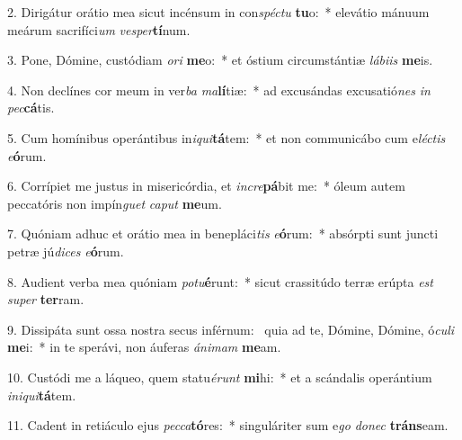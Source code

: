 2. Dirigátur orátio mea sicut incénsum in con\textit{spéc}\textit{tu} \textbf{tu}o:~*  elevátio mánuum meárum sacrifíci\textit{um} \textit{ves}\textit{per}\textbf{tí}num.\

3. Pone, Dómine, custódiam \textit{o}\textit{ri} \textbf{me}o:~*  et óstium circumstántiæ \textit{lá}\textit{bi}\textit{is} \textbf{me}is.\

4. Non declínes cor meum in ver\textit{ba} \textit{ma}\textbf{lí}tiæ:~*  ad excusándas excusatió\textit{nes} \textit{in} \textit{pec}\textbf{cá}tis.\

5. Cum homínibus operántibus in\textit{i}\textit{qui}\textbf{tá}tem:~*  et non communicábo cum e\textit{léc}\textit{tis} \textit{e}\textbf{ó}rum.\

6. Corrípiet me justus in misericórdia, et \textit{in}\textit{cre}\textbf{pá}bit me:~*  óleum autem peccatóris non impín\textit{guet} \textit{ca}\textit{put} \textbf{me}um.\

7. Quóniam adhuc et orátio mea in benepláci\textit{tis} \textit{e}\textbf{ó}rum:~*  absórpti sunt juncti petræ jú\textit{di}\textit{ces} \textit{e}\textbf{ó}rum.\

8. Audient verba mea quóniam \textit{pot}\textit{u}\textbf{é}runt:~*  sicut crassitúdo terræ erúpta \textit{est} \textit{su}\textit{per} \textbf{ter}ram.\

9. Dissipáta sunt ossa nostra secus inférnum: \dag\  quia ad te, Dómine, Dómine, ó\textit{cu}\textit{li} \textbf{me}i:~*  in te sperávi, non áuferas \textit{á}\textit{ni}\textit{mam} \textbf{me}am.\

10. Custódi me a láqueo, quem statu\textit{é}\textit{runt} \textbf{mi}hi:~*  et a scándalis operántium \textit{in}\textit{i}\textit{qui}\textbf{tá}tem.\

11. Cadent in retiáculo ejus \textit{pec}\textit{ca}\textbf{tó}res:~*  singuláriter sum e\textit{go} \textit{do}\textit{nec} \textbf{tráns}eam.\

